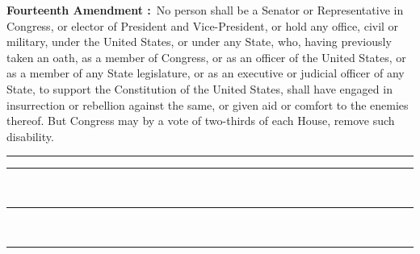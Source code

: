 \documentclass{article}
\begin{document}
\parbox[t][0.80\textheight][l]{\textwidth}{\fmmfamily \huge
	\textbf{Fourteenth Amendment :}\ 
	No person shall be a Senator or Representative in Congress, or
	elector of President and Vice-President, or hold any office, civil
	or military, under the United States, or under any State, who,
	having previously taken an oath, as a member of Congress, or as an
	officer of the United States, or as a member of any State
	legislature, or as an executive or judicial officer of any State, to
	support the Constitution of the United States, shall have engaged in
	insurrection or rebellion against the same, or given aid or comfort
	to the enemies thereof. But Congress may by a vote of two-thirds of
	each House, remove such disability.	}

\hfill{}
\eject

\newpage 

\begin{minipage}{0.5\textwidth}
\hspace{\textwidth}
\rule{.5pt}{\textheight}
\end{minipage}
\begin{minipage}{0.5\textwidth}
\vspace{24pt}
\noindent\hspace{18pt}\rule{5cm}{0.4pt}\\

\noindent\hspace{18pt}\rule{5cm}{0.4pt}\\

\noindent\hspace{18pt}\rule{5cm}{0.4pt}
\vfill
\end{minipage}
\end{document}
